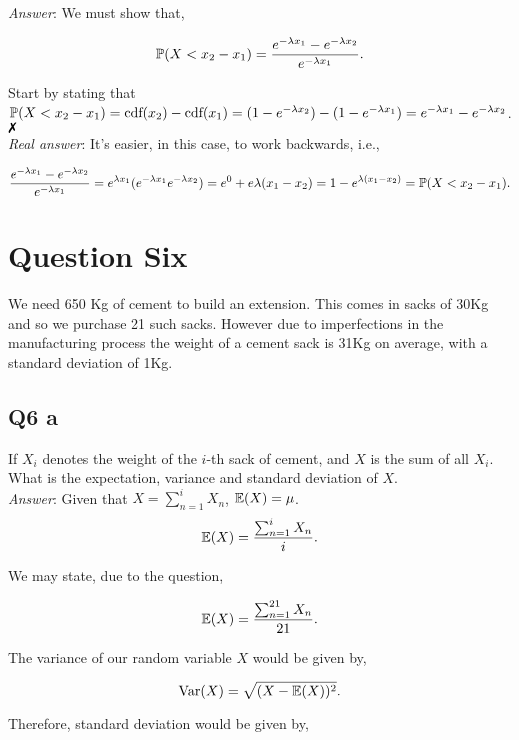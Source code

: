 \documentclass{article}
\begin{document}
            \textit{Answer}: We must show that,

            \[\mathbb{P}(X < x_2 - x_1) = \frac{e^{-\lambda x_1} - e^{-\lambda x_2}}{e^{-\lambda x_1}}.\]

            Start by stating that $\mathbb{P}(X < x_2 - x_1) = \text{cdf}(x_2) - \text{cdf}(x_1) = (1 - e^{-\lambda x_2}) - (1 - e^{-\lambda x_1}) = e^{-\lambda x_1} - e^{-\lambda x_2}$. $\xmark$\\

            \textit{Real answer}: It's easier, in this case, to work backwards, i.e.,

            \[\frac{e^{-\lambda x_1} - e^{-\lambda x_2}}{e^{-\lambda x_1}} = e^{\lambda x_1}(e^{-\lambda x_1}e^{-\lambda x_2}) = e^0 + e{\lambda(x_1 - x_2)} = 1 - e^{\lambda(x_1 - x_2)} = \mathbb{P}(X< x_2 - x_1).\]

    \section{Question Six}
        We need 650 Kg of cement to build an extension. This comes in sacks of 30Kg and so we purchase 21 such sacks. However due to imperfections in the manufacturing process the weight of a cement sack is 31Kg on average, with a standard deviation of 1Kg.\\

        \subsection{Q6 a}
            If $X_i$ denotes the weight of the $i$-th sack of cement, and $X$ is the sum of all $X_i$. What is the expectation, variance and standard deviation of $X$.\\

            \textit{Answer}: Given that $X = \sum_{n = 1}^{i}X_n$, $\mathbb{E}(X) = \mu$.\\

            \[\mathbb{E}(X) = \frac{\sum_{n = 1}^{i}X_n}{i}.\]

            We may state, due to the question, 

            \[\mathbb{E}(X) = \frac{\sum_{n = 1}^{21}X_n}{21}.\]

            The variance of our random variable $X$ would be given by,

            \[\text{Var}(X) = \sqrt{(X - \mathbb{E}(X))^2}.\]

            Therefore, standard deviation would be given by,
\end{document}
